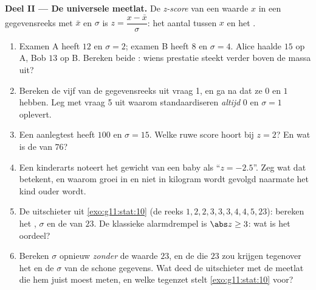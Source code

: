\begin{problem}
\medskip
\noindent\textbf{Deel II --- De universele meetlat.}
De \emph{z-score} van een waarde $x$ in een gegevensreeks met
 $\bar x$ en  $\sigma$ is
$z = \dfrac{x - \bar x}{\sigma}$: het aantal  tussen $x$
en het .
\begin{enumerate}[resume]
  \item Examen A heeft  $12$ en $\sigma = 2$; examen B heeft
         $8$ en $\sigma = 4$. Alice haalde $15$ op A, Bob $13$ op
        B. Bereken beide : wiens prestatie steekt verder boven de
        massa uit?
  \item Bereken de vijf  van de gegevensreeks uit vraag 1, en ga na
        dat ze  $0$ en  $1$ hebben. Leg met vraag
        5 uit waarom standaardiseren \emph{altijd}  $0$ en
        $\sigma = 1$ oplevert.
  \item Een aanlegtest heeft  $100$ en $\sigma = 15$. Welke ruwe
        score hoort bij $z = 2$? En wat is de  van $76$?
  \item Een kinderarts noteert het gewicht van een baby als ``$z = -2.5$''.
        Zeg wat dat betekent, en waarom groei in  en niet in
        kilogram wordt gevolgd naarmate het kind ouder wordt.
  \item De uitschieter uit \cref{exo:g11:stat:10} (de reeks
        $1, 2, 2, 3, 3, 3, 4, 4, 5, 23$): bereken het , $\sigma$ en
        de  van $23$. De klassieke alarmdrempel is $\abs z \geq 3$:
        wat is het oordeel?
  \item Bereken $\sigma$ opnieuw \emph{zonder} de waarde $23$, en de 
        die $23$ zou krijgen tegenover het  en de $\sigma$ van de
        schone gegevens. Wat deed de uitschieter met de meetlat die hem juist
        moest meten, en welke tegenzet stelt \cref{exo:g11:stat:10} voor?
\end{enumerate}


\end{problem}
